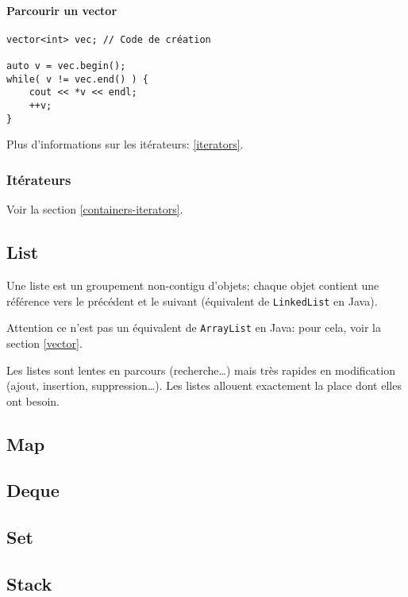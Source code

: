 \documentclass[10pt,a4paper,french]{article}
\begin{document}
\paragraph{Parcourir un vector}
\begin{verbatim}
vector<int> vec; // Code de création

auto v = vec.begin();
while( v != vec.end() ) {
    cout << *v << endl;
    ++v;
}
\end{verbatim}
Plus d'informations sur les itérateurs: \cref{iterators}.

\subsubsection{Itérateurs}
Voir la section \cref{containers-iterators}.

\subsection{List}\label{list}

Une liste est un groupement non-contigu d'objets; chaque objet contient une référence vers le précédent et le suivant (équivalent de {\tt LinkedList} en Java).

Attention ce n'est pas un équivalent de {\tt ArrayList} en Java: pour cela, voir la section \cref{vector}.

Les listes sont lentes en parcours (recherche\dots) mais très rapides en modification (ajout, insertion, suppression\dots).
Les listes allouent exactement la place dont elles ont besoin.

\subsection{Map}


\subsection{Deque}

\subsection{Set}


\subsection{Stack}
\end{document}
